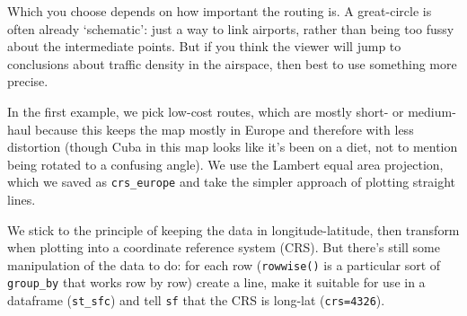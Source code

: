 \documentclass[
]{book}
\begin{document}
Which you choose depends on how important the routing is. A great-circle is often already `schematic': just a way to link airports, rather than being too fussy about the intermediate points. But if you think the viewer will jump to conclusions about traffic density in the airspace, then best to use something more precise.

In the first example, we pick low-cost routes, which are mostly short- or medium-haul because this keeps the map mostly in Europe and therefore with less distortion (though Cuba in this map looks like it's been on a diet, not to mention being rotated to a confusing angle). We use the Lambert equal area projection, which we saved as \texttt{crs\_europe} and take the simpler approach of plotting straight lines.

We stick to the principle of keeping the data in longitude-latitude, then transform when plotting into a coordinate reference system (CRS). But there's still some manipulation of the data to do: for each row (\texttt{rowwise()} is a particular sort of \texttt{group\_by} that works row by row) create a line, make it suitable for use in a dataframe (\texttt{st\_sfc}) and tell \texttt{sf} that the CRS is long-lat (\texttt{crs=4326}).
\end{document}
